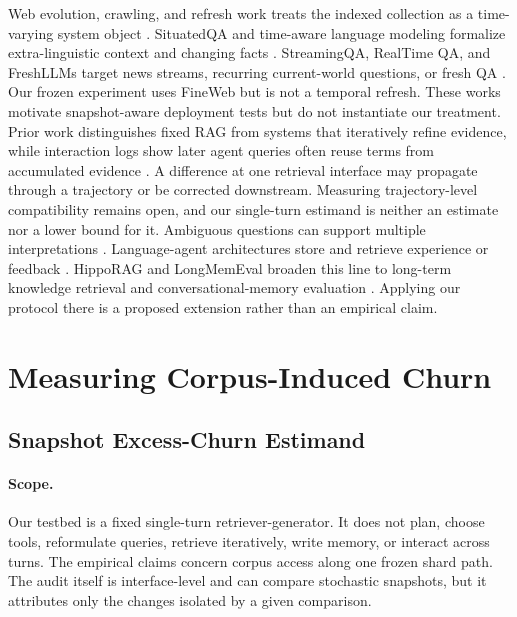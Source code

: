 \documentclass[sigconf,nonacm]{acmart}
\begin{document}
Web evolution, crawling, and refresh work treats the indexed collection as a time-varying system object \cite{cho2000evolution,cho2003effective,fetterly2003large, ntoulas2004whatsnew,adar2009webchanges}. SituatedQA and time-aware language modeling formalize extra-linguistic context and changing facts \cite{zhang2021situatedqa,dhingra2022timeaware}. StreamingQA, RealTime QA, and FreshLLMs target news streams, recurring current-world questions, or fresh QA \cite{liska2022streamingqa,kasai2023realtimeqa,vu2024freshllms}. Our frozen experiment uses FineWeb \cite{penedo2024fineweb} but is not a temporal refresh. These works motivate snapshot-aware deployment tests but do not instantiate our treatment. Prior work distinguishes fixed RAG from systems that iteratively refine evidence, while interaction logs show later agent queries often reuse terms from accumulated evidence \cite{deng2026agenticrag,ning2026agenticsearch}. A difference at one retrieval interface may propagate through a trajectory or be corrected downstream. Measuring trajectory-level compatibility remains open, and our single-turn estimand is neither an estimate nor a lower bound for it. Ambiguous questions can support multiple interpretations \cite{min2020ambigqa}. Language-agent architectures store and retrieve experience or feedback \cite{park2023generative,shinn2023reflexion,zhang2023semiparametric}. HippoRAG and LongMemEval broaden this line to long-term knowledge retrieval and conversational-memory evaluation \cite{gutierrez2024hipporag,wu2025longmemeval}. Applying our protocol there is a proposed extension rather than an empirical claim.

\section{Measuring Corpus-Induced Churn}
\label{sec:method}

\subsection{Snapshot Excess-Churn Estimand}
\label{sec:estimand}

\paragraph{Scope.} Our testbed is a fixed single-turn retriever-generator. It does not plan, choose tools, reformulate queries, retrieve iteratively, write memory, or interact across turns. The empirical claims concern corpus access along one frozen shard path. The audit itself is interface-level and can compare stochastic snapshots, but it attributes only the changes isolated by a given comparison.
\end{document}
